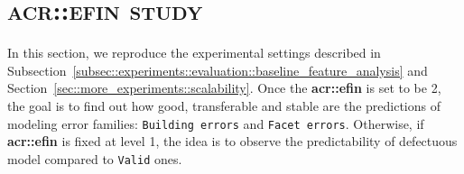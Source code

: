 \section{\textsc{\acrlong*{acr::efin} study}}
    \label{sec::more_experiments::finesse}
    In this section, we reproduce the experimental settings described in Subsection~\ref{subsec::experiments::evaluation::baseline_feature_analysis} and Section~\ref{sec::more_experiments::scalability}.
    Once the \textbf{\gls{acr::efin}} is set to be 2, the goal is to find out how good, transferable and stable are the predictions of modeling error families: \texttt{Building errors} and \texttt{Facet errors}.
    Otherwise, if \textbf{\gls{acr::efin}} is fixed at level 1, the idea is to observe the predictability of defectuous model compared to \texttt{Valid} ones.
    
